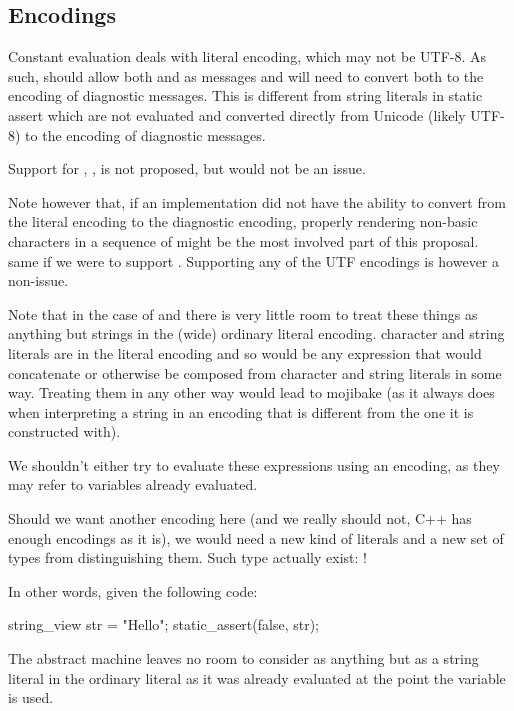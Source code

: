 \documentclass{wg21}
\begin{document}
\subsection{Encodings}

Constant evaluation deals with literal encoding, which may not be UTF-8.
As such,  should allow both  and  as messages and will need to convert both to the encoding of diagnostic messages.
This is different from string literals in static assert which are not evaluated and converted directly from Unicode (likely UTF-8) to the encoding of diagnostic messages.

Support for , ,  is not proposed, but would not be an issue.

Note however that, if an implementation did not have the ability to convert from the literal encoding to the diagnostic encoding,
properly rendering non-basic characters in a sequence of  might be the most involved part of this proposal. same if we were to support .
Supporting any of the UTF encodings is however a non-issue.

Note that in the case of  and  there is very little room to treat these things as anything but strings in the (wide) ordinary literal encoding.
character and string literals are in the literal encoding and so would be any expression that would concatenate or otherwise be composed from
character and string literals in some way.
Treating them in any other way would lead to mojibake (as it always does when interpreting a string in an encoding that is different from the one it is constructed with).

We shouldn't either try to evaluate these expressions using an encoding, as they may refer to variables already evaluated.

Should we want another encoding here (and we really should not, C++ has enough encodings as it is), we would need a new kind of literals and a new set of types from distinguishing them. Such type actually exist: !

In other words, given the following code:

\begin{colorblock}
string_view str = "Hello";
static_assert(false, str);
\end{colorblock}

The abstract machine leaves no room to consider  as anything but as a string literal in the ordinary literal as
it was already evaluated at the point the variable is used.
\end{document}
